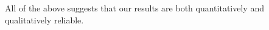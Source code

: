 \documentclass[11pt]{article}
\def\bfr{\bf\color{red}}
\begin{document}
%
%
%



All of the above suggests that our results are both quantitatively and qualitatively reliable.\\
\end{document}
